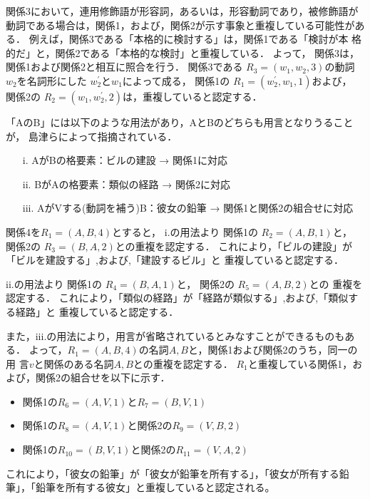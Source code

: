 \vspace{2ex}


関係3において，連用修飾語が形容詞，あるいは，形容動詞であり，被修飾語が
動詞である場合は，関係1，および，関係2が示す事象と重複している可能性があ
る．
例えば，関係3である「本格的に検討する」は，関係1である「検討が本
格的だ」と，関係2である「本格的な検討」と重複している．
よって，
関係3は，関係1および関係2と相互に照合を行う．
関係3である
$R_{3}=(w_{1},w_{2},3)$の動詞$w_{2}$を名詞形にした
$w_{2}^{\prime}$と$w_{1}$によって成る，
関係1の
$R_{1}=(w_{2}^{\prime},w_{1},1)$および，
関係2の
$R_{2}=(w_{1},w_{2}^{\prime},2)$は，重複していると認定する．

\vspace{2ex}


「AのB」には以下のような用法があり，AとBのどちらも用言となりうることが，
島津ら\cite{shimazu85}によって指摘されている．
\begin{itemize}
 \setlength{\itemsep}{-1.5mm}
 \item[i.] AがBの格要素：ビルの建設 → 関係1に対応
 \item[ii.] BがAの格要素：類似の経路 → 関係2に対応
 \item[iii.] AがVする(動詞を補う)B：彼女の鉛筆 → 関係1と関係2の組合せに対応
\end{itemize}
関係4を$R_{1}=(A,B,4)$とすると，
i.の用法より
関係1の
$R_{2}=(A,B,1)$と，
関係2の
$R_{3}=(B,A,2)$との重複を認定する．
これにより，「ビルの建設」が「ビルを建設する」,および,「建設するビル」と
重複していると認定する．

ii.の用法より
関係1の
$R_{4}=(B,A,1)$と，
関係2の
$R_{5}=(A,B,2)$との
重複を認定する．
これにより，「類似の経路」が「経路が類似する」,および,「類似する経路」と
重複していると認定する．

また，iii.の用法により，用言が省略されているとみなすことができるものもある．
よって，$R_{1}=(A,B,4)$の名詞$A,B$と，関係1および関係2のうち，同一の用
言$v$と関係のある名詞$A,B$との重複を認定する．
$R_{1}$と重複している関係1，および，関係2の組合せを以下に示す．
\begin{itemize}
 \setlength{\itemsep}{-1.5mm}
\item 関係1の$R_{6}=(A,V,1)$と$R_{7}=(B,V,1)$ 
\item 関係1の$R_{8}=(A,V,1)$と関係2の$R_{9}=(V,B,2)$ 
\item 関係1の$R_{10}=(B,V,1)$と関係2の$R_{11}=(V,A,2)$ 
\end{itemize}
これにより，「彼女の鉛筆」が「彼女が鉛筆を所有する」，「彼女が所有する鉛
筆」，「鉛筆を所有する彼女」と重複していると認定される。

